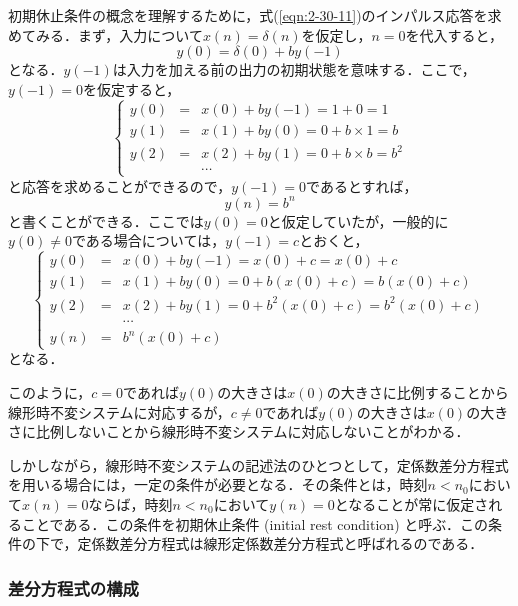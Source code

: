 初期休止条件の概念を理解するために，式(\ref{eqn:2-30-11})のインパルス応答を求めてみる．まず，入力について$x(n)=\delta(n)$を仮定し，$n=0$を代入すると，
\begin{equation}
y(0)=\delta(0)+by(-1)
\end{equation}
となる．$y(-1)$は入力を加える前の出力の初期状態を意味する．ここで，$y(-1)=0$を仮定すると，
\begin{equation}
\left \{
\begin{array}{lll}
y(0)&=&x(0)+by(-1)=1+0=1 \\
y(1)&=&x(1)+by(0)=0+b\times 1=b \\
y(2)&=&x(2)+by(1)=0+b\times b=b^2 \\
 & & \cdots
\end{array}
\right .
\end{equation}
と応答を求めることができるので，$y(-1)=0$であるとすれば，
\begin{equation}
y(n)=b^n
\end{equation}
と書くことができる．ここでは$y(0)=0$と仮定していたが，一般的に$y(0)\neq 0$である場合については，$y(-1)=c$とおくと，
\begin{equation}
\left \{
\begin{array}{ccl}
y(0)&=&x(0)+by(-1)=x(0)+c=x(0)+c \\
y(1)&=&x(1)+by(0)=0+b(x(0)+c)=b(x(0)+c) \\
y(2)&=&x(2)+by(1)=0+b^2(x(0)+c)=b^2(x(0)+c) \\
 & & \cdots \\
y(n)&=&b^n(x(0)+c)
\end{array}
\right .
\end{equation}
となる．

このように，$c=0$であれば$y(0)$の大きさは$x(0)$の大きさに比例することから線形時不変システムに対応するが，$c\neq 0$であれば$y(0)$の大きさは$x(0)$の大きさに比例しないことから線形時不変システムに対応しないことがわかる．

しかしながら，線形時不変システムの記述法のひとつとして，定係数差分方程式を用いる場合には，一定の条件が必要となる．その条件とは，時刻$n<n_0$において$x(n)=0$ならば，時刻$n<n_0$において$y(n)=0$となることが常に仮定されることである．この条件を初期休止条件 (initial rest condition) と呼ぶ．この条件の下で，定係数差分方程式は線形定係数差分方程式と呼ばれるのである．

\subsubsection{差分方程式の構成}

